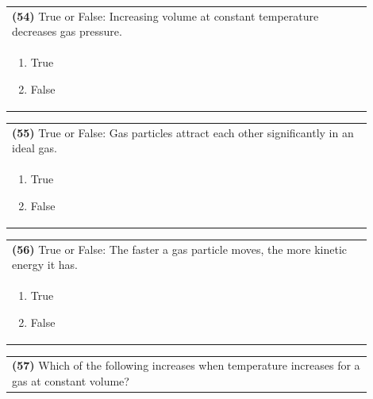 \documentclass{article}
\begin{document}
{{\vspace{0.2cm}
\noindent\begin{tabular}{|p{0.9\linewidth}|}
\hline
\textbf{(54)} True or False: Increasing volume at constant temperature decreases gas pressure.\\[0.2cm]

\begin{minipage}[t]{0.85\linewidth}
\begin{enumerate}[label=\alph*.]
\item True
\item False
\end{enumerate}
\end{minipage}\\[0.2cm]
\hline
\end{tabular}

\vspace{0.2cm}
\noindent\begin{tabular}{|p{0.9\linewidth}|}
\hline
\textbf{(55)} True or False: Gas particles attract each other significantly in an ideal gas.\\[0.2cm]

\begin{minipage}[t]{0.85\linewidth}
\begin{enumerate}[label=\alph*.]
\item True
\item False
\end{enumerate}
\end{minipage}\\[0.2cm]
\hline
\end{tabular}

\vspace{0.2cm}
\noindent\begin{tabular}{|p{0.9\linewidth}|}
\hline
\textbf{(56)} True or False: The faster a gas particle moves, the more kinetic energy it has.\\[0.2cm]

\begin{minipage}[t]{0.85\linewidth}
\begin{enumerate}[label=\alph*.]
\item True
\item False
\end{enumerate}
\end{minipage}\\[0.2cm]
\hline
\end{tabular}

\newpage

\noindent\begin{tabular}{|p{0.9\linewidth}|}
\hline
\textbf{(57)} Which of the following increases when temperature increases for a gas at constant volume?\\[0.2cm]


\end{tabular}}}
\end{document}
